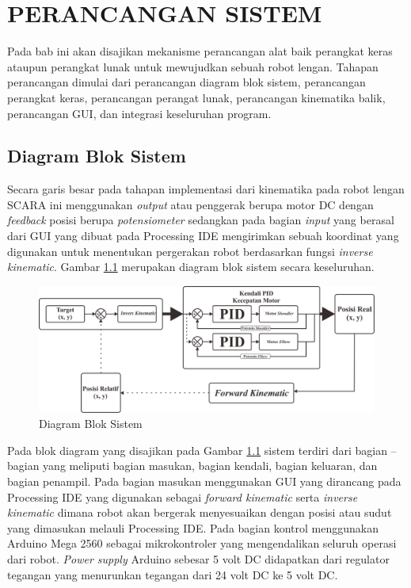 
\chapter{PERANCANGAN SISTEM}
Pada bab ini akan disajikan mekanisme perancangan alat baik perangkat keras ataupun perangkat lunak untuk mewujudkan sebuah robot lengan. Tahapan perancangan dimulai dari perancangan diagram blok sistem, perancangan perangkat keras, perancangan perangat lunak, perancangan kinematika balik, perancangan GUI, dan integrasi keseluruhan program. 
\section{ Diagram Blok Sistem }
Secara garis besar pada tahapan implementasi dari kinematika pada robot lengan SCARA ini menggunakan \textit{output} atau penggerak berupa motor DC dengan \textit{feedback} posisi berupa \textit{potensiometer} sedangkan pada bagian  \textit{input} yang berasal dari GUI yang dibuat pada Processing IDE mengirimkan sebuah koordinat yang digunakan untuk menentukan pergerakan robot berdasarkan fungsi \textit{inverse kinematic}. Gambar \ref{pic.diagram.bloksistem} merupakan diagram blok sistem secara keseluruhan.
\begin{figure}[H]
	\centering
	\includegraphics[width=13cm]{gambar/diagram_blok_new.png}
	\caption{Diagram Blok Sistem}
	\label{pic.diagram.bloksistem}
\end{figure}
Pada blok diagram yang disajikan pada Gambar \ref{pic.diagram.bloksistem} sistem terdiri dari bagian – bagian yang meliputi bagian masukan, bagian kendali, bagian keluaran, dan bagian penampil. Pada bagian masukan menggunakan GUI yang dirancang pada Processing IDE yang digunakan sebagai \textit{forward kinematic} serta \textit{inverse kinematic} dimana robot akan bergerak menyesuaikan dengan posisi atau sudut yang dimasukan melauli Processing IDE. 
Pada bagian kontrol menggunakan Arduino Mega 2560 sebagai mikrokontroler yang mengendalikan seluruh operasi dari robot. \textit{Power supply} Arduino sebesar 5 volt DC didapatkan dari regulator tegangan yang menurunkan tegangan dari 24 volt DC ke 5 volt DC. 

